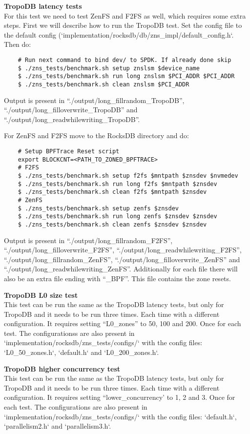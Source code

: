 \textbf{TropoDB latency tests}\\
For this test we need to test ZenFS and F2FS as well, which requires some extra steps.
First we will describe how to run the TropoDB test.
Set the config file to the default config (`implementation/rocksdb/db/zns\_impl/default\_config.h`.
Then do: 
\begin{verbatim}
    # Run next command to bind dev/ to SPDK. If already done skip
    $ ./zns_tests/benchmark.sh setup znslsm $device_name 
    $ ./zns_tests/benchmark.sh run long znslsm $PCI_ADDR $PCI_ADDR
    $ ./zns_tests/benchmark.sh clean znslsm $PCI_ADDR
\end{verbatim}
Output is present in ``./output/long\_fillrandom\_TropoDB'', ``./output/long\_filloverwrite\_TropoDB'' and ``./output/long\_readwhilewriting\_TropoDB''.

For ZenFS and F2FS move to the RocksDB directory and do:
\begin{verbatim}
    # Setup BPFTrace Reset script
    export BLOCKCNT=<PATH_TO_ZONED_BPFTRACE>
    # F2FS
    $ ./zns_tests/benchmark.sh setup f2fs $mntpath $znsdev $nvmedev
    $ ./zns_tests/benchmark.sh run long f2fs $mntpath $znsdev
    $ ./zns_tests/benchmark.sh clean f2fs $mntpath $znsdev
    # ZenFS
    $ ./zns_tests/benchmark.sh setup zenfs $znsdev 
    $ ./zns_tests/benchmark.sh run long zenfs $znsdev $znsdev
    $ ./zns_tests/benchmark.sh clean zenfs $znsdev $znsdev
\end{verbatim}
Output is present in ``./output/long\_fillrandom\_F2FS'', ``./output/long\_filloverwrite\_F2FS'', ``./output/long\_readwhilewriting\_F2FS'', ``./output/long\_fillrandom\_ZenFS'', ``./output/long\_filloverwrite\_ZenFS'' and ``./output/long\_readwhilewriting\_ZenFS''. Additionally for each file there will also be an extra file ending with ``\_BPF''. This file contains the zone resets.

\textbf{TropoDB L0 size test}\\
This test can be run the same as the TropoDB latency tests, but only for TropoDB and it needs to be run three times. Each time with a different configuration. It requires setting ``L0\_zones'' to 50, 100 and 200. Once for each test. The configurationss are also present in `implementation/rocksdb/zns\_tests/configs/` with the config files: `L0\_50\_zones.h`, `default.h` and `L0\_200\_zones.h`.


\textbf{TropoDB higher concurrency test}\\
This test can be run the same as the TropoDB latency tests, but only for TropoDB and it needs to be run three times. Each time with a different configuration. It requires setting ``lower\_concurrency' to 1, 2 and 3. Once for each test. The configurations are also present in `implementation/rocksdb/zns\_tests/configs/` with the config files: `default.h`, `parallelism2.h` and `parallelism3.h`.

